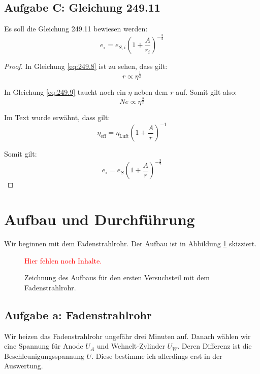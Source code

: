 \documentclass[11pt]{article}
\newcommand{\fehlt}{\textcolor{red}{Hier fehlen noch Inhalte.}}
\begin{document}
\subsection{Aufgabe C: Gleichung 249.11}

Es soll die Gleichung 249.11 bewiesen werden:
\[ e_\circ = e_{S, i} \left( 1 + \frac A{r_i} \right)^{-\frac 32} \]

\begin{proof}
	In Gleichung \eqref{eq:249.8} ist zu sehen, dass gilt:
	\[ r \propto \eta^{\frac 12} \]

	In Gleichung \eqref{eq:249.9} taucht noch ein $\eta$ neben dem $r$ auf.
	Somit gilt also:
	\[ N e \propto \eta^{\frac 32} \]

	Im Text wurde erwähnt, dass gilt:
	\[ \eta_\text{eff} = \eta_\text{Luft} \left( 1 + \frac Ar \right)^{-1} \]

	Somit gilt:
	\[ e_\circ = e_S \left( 1 + \frac Ar \right)^{-\frac 32} \]
\end{proof}


\section{Aufbau und Durchführung}

Wir beginnen mit dem Fadenstrahlrohr. Der Aufbau ist in Abbildung
\ref{fig:Fadenstrahlrohr} skizziert.

\begin{figure}[h!]
	\centering
	\fehlt
	\caption{Zeichnung des Aufbaus für den ersten Versuchsteil mit dem Fadenstrahlrohr.}
	\label{fig:Fadenstrahlrohr}
\end{figure}

\subsection{Aufgabe a: Fadenstrahlrohr}

\label{Durchführung-a}

Wir heizen das Fadenstrahlrohr ungefähr drei Minuten auf. Danach wählen wir
eine Spannung für Anode $U_A$ und Wehnelt-Zylinder $U_W$. Deren Differenz ist
die Beschleunigungsspannung $U$. Diese bestimme ich allerdings erst in der
Auswertung.
\end{document}
